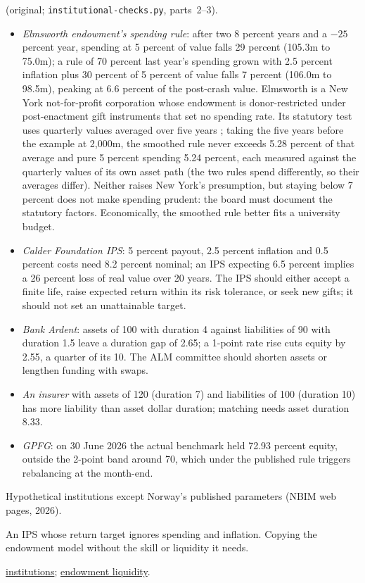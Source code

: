 \begin{qfmethod}
 (original; \texttt{institutional-checks.py}, parts~2--3).
\begin{itemize}
\item \emph{Elmsworth endowment's spending rule}: after two 8 percent years and a $-25$ percent year, spending at 5 percent of value falls 29 percent (105.3m to 75.0m); a rule of 70 percent last year's spending grown with 2.5 percent inflation plus 30 percent of 5 percent of value falls 7 percent (106.0m to 98.5m), peaking at 6.6 percent of the post-crash value. Elmsworth is a New York not-for-profit corporation whose endowment is donor-restricted under post-enactment gift instruments that set no spending rate. Its statutory test uses quarterly values averaged over five years \citep[sec.~553(d)]{ny-npc-553}; taking the five years before the example at 2,000m, the smoothed rule never exceeds 5.28 percent of that average and pure 5 percent spending 5.24 percent, each measured against the quarterly values of its own asset path (the two rules spend differently, so their averages differ). Neither raises New York's presumption, but staying below 7 percent does not make spending prudent: the board must document the statutory factors. Economically, the smoothed rule better fits a university budget.
\item \emph{Calder Foundation IPS}: 5 percent payout, 2.5 percent inflation and 0.5 percent costs need 8.2 percent nominal; an IPS expecting 6.5 percent implies a 26 percent loss of real value over 20 years. The IPS should either accept a finite life, raise expected return within its risk tolerance, or seek new gifts; it should not set an unattainable target.
\item \emph{Bank Ardent}: assets of 100 with duration 4 against liabilities of 90 with duration 1.5 leave a duration gap of 2.65; a 1-point rate rise cuts equity by 2.55, a quarter of its 10. The ALM committee should shorten assets or lengthen funding with swaps.
\item \emph{An insurer} with assets of 120 (duration 7) and liabilities of 100 (duration 10) has more liability than asset dollar duration; matching needs asset duration 8.33.
\item \emph{GPFG}: on 30 June 2026 the actual benchmark held 72.93 percent equity, outside the 2-point band around 70, which under the published rule triggers rebalancing at the month-end.
\end{itemize}

 Hypothetical institutions except Norway's published parameters (NBIM web pages, 2026).

 An IPS whose return target ignores spending and inflation. Copying the endowment model without the skill or liquidity it needs.

 \hyperref[def:institutional-investor-characteristics]{institutions}; \hyperref[meth:endowment-liquidity-allocation]{endowment liquidity}.

\end{qfmethod}

